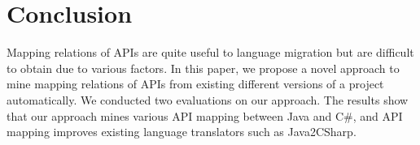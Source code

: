 \section{Conclusion}
\label{sec:colcusion} Mapping relations of APIs are quite useful to
language migration but are difficult to obtain due to various
factors. In this paper, we propose a novel approach to mine mapping
relations of APIs from existing different versions of a project
automatically. We conducted two evaluations on our approach. The
results show that our approach mines various API mapping between
Java and C\#, and API mapping improves existing language translators
such as Java2CSharp.
